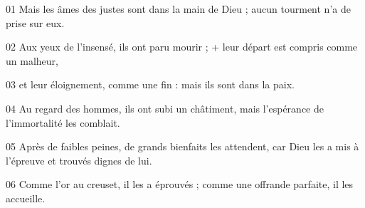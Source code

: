 01 Mais les âmes des justes sont dans la main de Dieu ;  aucun tourment n’a de prise sur eux.

02 Aux yeux de l’insensé, ils ont paru mourir ; + leur départ est compris comme un malheur,

03 et leur éloignement, comme une fin : mais ils sont dans la paix.

04 Au regard des hommes, ils ont subi un châtiment, mais l’espérance de l’immortalité les comblait.

05 Après de faibles peines, de grands bienfaits les attendent, car Dieu les a mis à l’épreuve et trouvés dignes de lui.

06 Comme l’or au creuset, il les a éprouvés ; comme une offrande parfaite, il les accueille.

